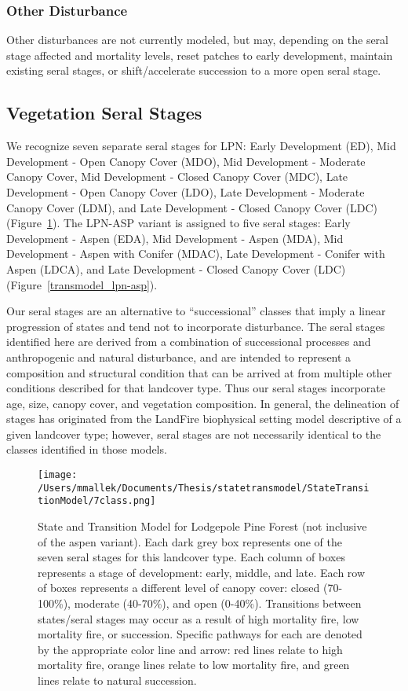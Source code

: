 \subsubsection{Other Disturbance}
Other disturbances are not currently modeled, but may, depending on the seral stage affected and mortality levels, reset patches to early development, maintain existing seral stages, or shift/accelerate succession to a more open seral stage. 

\subsection*{Vegetation Seral Stages}
We recognize seven separate seral stages for LPN: Early Development (ED), Mid Development - Open Canopy Cover (MDO), Mid Development - Moderate Canopy Cover, Mid Development - Closed Canopy Cover (MDC), Late Development - Open Canopy Cover (LDO), Late Development - Moderate Canopy Cover (LDM), and Late Development - Closed Canopy Cover (LDC) (Figure~\ref{transmodel_lpn}). The LPN-ASP variant is assigned to five seral stages: Early Development - Aspen (EDA), Mid Development - Aspen (MDA), Mid Development - Aspen with Conifer (MDAC), Late Development - Conifer with Aspen (LDCA), and Late Development - Closed Canopy Cover (LDC) (Figure~\ref{transmodel_lpn-asp}).

Our seral stages are an alternative to ``successional'' classes that imply a linear progression of states and tend not to incorporate disturbance. The seral stages identified here are derived from a combination of successional processes and anthropogenic and natural disturbance, and are intended to represent a composition and structural condition that can be arrived at from multiple other conditions described for that landcover type. Thus our seral stages incorporate age, size, canopy cover, and vegetation composition. In general, the delineation of stages has originated from the LandFire biophysical setting model descriptive of a given landcover type; however, seral stages are not necessarily identical to the classes identified in those models.


\begin{figure}[htbp]
\centering
\texttt{[image: /Users/mmallek/Documents/Thesis/statetransmodel/StateTransitionModel/7class.png]}
\caption{State and Transition Model for Lodgepole Pine Forest (not inclusive of the aspen variant). Each dark grey box represents one of the seven seral stages for this landcover type. Each column of boxes represents a stage of development: early, middle, and late. Each row of boxes represents a different level of canopy cover: closed (70-100\%), moderate (40-70\%), and open (0-40\%). Transitions between states/seral stages may occur as a result of high mortality fire, low mortality fire, or succession. Specific pathways for each are denoted by the appropriate color line and arrow: red lines relate to high mortality fire, orange lines relate to low mortality fire, and green lines relate to natural succession.} 
\label{transmodel_lpn}
\end{figure}

